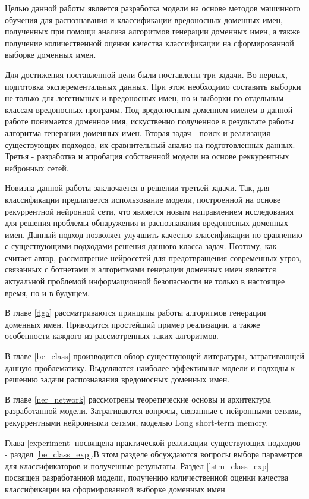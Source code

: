Целью данной работы является разработка модели на основе методов машинного обучения для распознавания и классификации вредоносных доменных имен, полученных при помощи анализа алгоритмов генерации доменных имен, а также получение количественной оценки качества классификации на сформированной выборке доменных имен.

Для достижения поставленной цели были поставлены три задачи. Во-первых, подготовка эксперементальных данных. При этом необходимо составить выборки не только для легетимных и вредоносных имен, но и выборки по отдельным классам вредоносных программ. Под вредоносным доменном именем в данной работе понимается доменное имя, искуственно полученное в результате работы алгоритма генерации доменных имен. Вторая задач - поиск и реализация существующих подходов, их сравнительный анализ на подготовленных данных. Третья - разработка и апробация собственной модели на основе реккурентных нейронных сетей.

Новизна данной работы заключается в решении третьей задачи. Так, для классификации предлагается использование модели, построенной на основе рекуррентной нейронной сети, что является новым направлением исследования для решения проблемы обнаружения и распознавания вредоносных доменных имен. Данный подход позволяет улучшить качество классификации по сравнению с существующими подходами решения данного класса задач. Поэтому, как считает автор, рассмотрение нейросетей для предотвращения современных угроз, связанных с ботнетами и алгоритмами генерации доменных имен является актуальной проблемой информационной безопасности не только в настоящее время, но и в будущем.

В главе \ref{dga} рассматриваются принципы работы алгоритмов генерации доменных имен. Приводится простейший пример реализации, а также особенности каждого из рассмотренных таких алгоритмов.

В главе \ref{be_class} производится обзор существующей литературы, затрагивающей данную проблематику. Выделяются наиболее эффективные модели и подходы к решению задачи распознавания вредоносных доменных имен.

В главе \ref{ner_network} рассмотрены теоретические основы и архитектура разработанной модели. Затрагиваются вопросы, связанные с нейронными сетями, рекуррентными нейронными сетями, моделью Long short-term memory.

Глава \ref{experiment} посвящена практической реализации существующих подходов - раздел \ref{be_class_exp}.В этом разделе обсуждаются вопросы выбора параметров для классификаторов и полученные результаты. Раздел \ref{lstm_class_exp} посвящен разработанной модели, получению количественной оценки качества классификации на сформированной выборке доменных имен
\clearpage